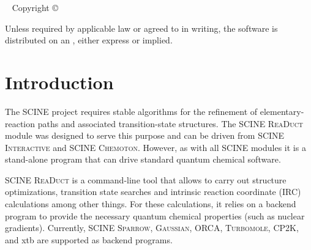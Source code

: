\documentclass[]{tufte-book}
\title[SCINE ReaDuct manual]{User Manual \vskip 0.5em {\setlength{\parindent}{0pt} \Huge SCINE ReaDuct 3.0.0}}
\author[The SCINE ReaDuct Developers]{The SCINE ReaDuct Developers: \newline \noindent Christoph Brunken, Katja-Sophia Csizi, Stephanie Grimmel, Stefan Gugler, Jan-Grimo Sobez, Miguel Steiner, Paul T\"urtscher, Jan Unsleber, Alain C. Vaucher, Thomas Weymuth, and Markus Reiher}
\newcommand{\monthyear}{%
  \ifcase\month\or January\or February\or March\or April\or May\or June\or
  July\or August\or September\or October\or November\or
  December\fi\space\number\year
}
\begin{document}
\setlength{\parindent}{0pt}

\frontmatter


\maketitle


\newpage
\begin{fullwidth}
~\vfill
\thispagestyle{empty}
\setlength{\parindent}{0pt}
\setlength{\parskip}{\baselineskip}
Copyright \copyright\ \the\year\ \thanklessauthor


\par{}

\par Unless required by applicable law or agreed to in writing, the software
is distributed on an , either express or implied. 

\end{fullwidth}

\tableofcontents




\mainmatter

\let\cleardoublepage\clearpage
\chapter{Introduction}

The SCINE project requires stable algorithms for the refinement of elementary-reaction paths and associated transition-state
structures. The SCINE \textsc{ReaDuct} module was designed to serve this purpose and can be driven from SCINE \textsc{Interactive}
and SCINE \textsc{Chemoton}. However, as with all SCINE modules it is a stand-alone program that can drive standard quantum
chemical software.

SCINE \textsc{ReaDuct} is a command-line tool that allows to carry out structure optimizations, transition state searches
and intrinsic reaction coordinate (IRC) calculations among other things.
For these calculations, it relies on a backend program to provide the necessary quantum chemical properties (such
as nuclear gradients). Currently, SCINE \textsc{Sparrow}\cite{sparrow}, \textsc{Gaussian}\cite{gaussian09}, ORCA\cite{orca},
\textsc{Turbomole}\cite{turbomole}, CP2K\cite{cp2k}, and xtb\cite{xtb} are supported as backend programs.
\end{document}
